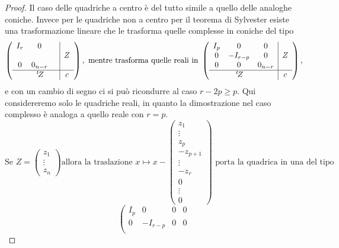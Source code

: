  \begin{proof}
  Il caso delle quadriche a centro è del tutto simile a quello delle analoghe coniche.
  Invece per le quadriche non a centro per il teorema di Sylvester esiste una trasformazione lineare che le trasforma quelle complesse in
  coniche del tipo
  $$\left( \begin{array}{ccc|c}
   I_r & 0 & & \\
   & & & Z\\
   0 & 0_{n-r} & & \\
   \hline
    & \tra Z & & c
  \end{array} \right),
  \text{ mentre trasforma quelle reali in }
  \left( \begin{array}{ccc|c}
   I_p & 0 & 0 & \\
   0 & -I_{r-p} & 0 & Z\\
   0 & 0 & 0_{n-r} & \\
   \hline
   & \tra Z & & c
  \end{array} \right),$$
  e con un cambio di segno ci si può ricondurre al caso $r-2p\ge p$.
  Qui considereremo solo le quadriche reali, in quanto la dimostrazione nel caso complesso è analoga a quello reale con $r=p$.
  $$ \text{Se } Z=\left( \begin{array}{c}
                         z_1\\
                         \vdots\\
                         z_n
                        \end{array}\right) \text{allora la traslazione } x\mapsto x-
                        \left( \begin{array}{c}
                         z_1\\
                         \vdots\\
                         z_p\\
                         -z_{p+1}\\
                         \vdots\\
                         -z_r\\
                         0\\
                         \vdots\\
                         0
                        \end{array}\right) \text{ porta la quadrica in una del tipo}$$
$$\left( \begin{array}{ccc|c}
   I_p & 0 & 0 & 0\\
   0 & -I_{r-p} & 0 & 0 \\

\end{array}$$
\end{proof}
